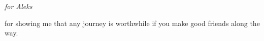 \thispagestyle{empty}
{}

\vspace*{3cm}

\begin{center}
  \emph{for Aleks} \\\medskip

  for showing me that any journey is worthwhile if you make good friends along the way.
\end{center}
